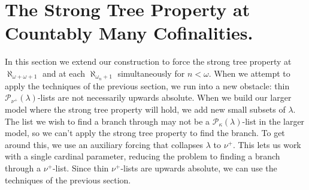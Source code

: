 \documentclass[psamsfonts]{amsart}
\theoremstyle{definition}
\newcommand{\la}{\lambda}
\newcommand{\ka}{\kappa}
\newcommand{\w}{\omega}
\newcommand{\mc}{\mathcal}
\numberwithin{equation}{section}
\begin{document}
\section{The Strong Tree Property at Countably Many Cofinalities.}\label{section:sTP}
In this section we extend our construction to force the strong tree property at $\aleph_{\w+\w+1}$ and at each $\aleph_{\w_n+1}$ simultaneously for $n<\w$. When we attempt to apply the techniques of the previous section, we run into a new obstacle: thin $\mc{P}_{\nu^+}(\la)$-lists are not necessarily upwards absolute. When we build our larger model where the strong tree property will hold, we add new small subsets of $\la$. The list we wish to find a branch through may not be a $\mc{P}_\ka(\la)$-list in the larger model, so we can't apply the strong tree property to find the branch. To get around this, we use an auxiliary forcing that collapses $\la$ to $\nu^+$. This lets us work with a single cardinal parameter, reducing the problem to finding a branch through a $\nu^+$-list. Since thin $\nu^+$-lists are upwards absolute, we can use the techniques of the previous section.
\end{document}
